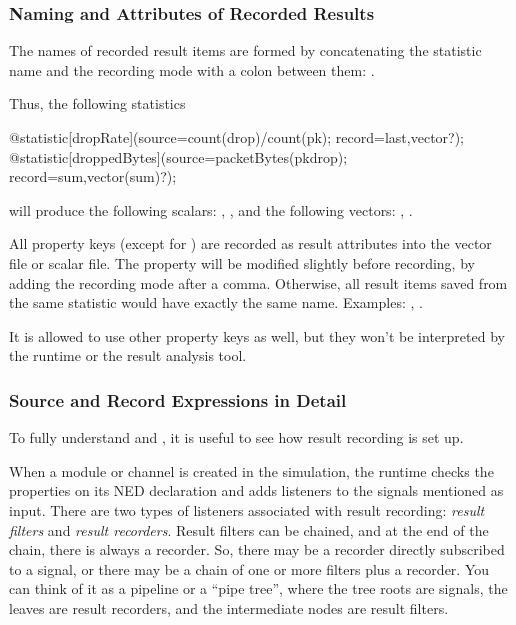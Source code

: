 \subsubsection{Naming and Attributes of Recorded Results}
\label{sec:simple-modules:naming-and-attributes-of-recorded-results}

The names of recorded result items are formed by concatenating the
statistic name and the recording mode with a colon between them:
.

Thus, the following statistics

\begin{ned}
@statistic[dropRate](source=count(drop)/count(pk); record=last,vector?);
@statistic[droppedBytes](source=packetBytes(pkdrop); record=sum,vector(sum)?);
\end{ned}

will produce the following scalars: , ,
and the following vectors: , .

All property keys (except for ) are recorded as result
attributes into the vector file or scalar file. The  property
will be modified slightly before recording, by adding the recording mode
after a comma. Otherwise, all result items saved from the same statistic
would have exactly the same name. Examples: ,
.

It is allowed to use other property keys as well, but they won't be
interpreted by the {\opp} runtime or the result analysis tool.


\subsubsection{Source and Record Expressions in Detail}
\label{sec:simple-modules:statistic-source-and-record-details}

To fully understand  and , it is useful
to see how result recording is set up.

When a module or channel is created in the simulation, the {\opp} runtime
checks the  properties on its NED declaration and adds
listeners to the signals mentioned as input. There are two types of
listeners associated with result recording: \textit{result filters} and
\textit{result recorders}. Result filters can be chained, and at the end of
the chain, there is always a recorder. So, there may be a recorder directly
subscribed to a signal, or there may be a chain of one or more filters plus
a recorder. You can think of it as a pipeline or a ``pipe tree'', where the
tree roots are signals, the leaves are result recorders, and the intermediate
nodes are result filters.


